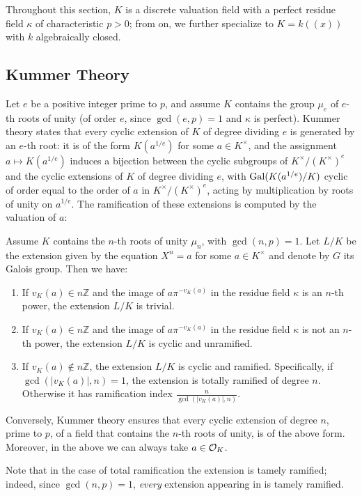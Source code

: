 Throughout this section, $K$ is a discrete valuation field with a perfect
residue field $\kappa$ of characteristic $p > 0$; from
 on, we further specialize to
$K = k((x))$ with $k$ algebraically closed.

\subsection{Kummer Theory}\label{subsection:kummer_theory}

Let $e$ be a positive integer prime to $p$, and assume $K$ contains the group
$\mu_e$ of $e$-th roots of unity (of order $e$, since $\gcd(e,p)=1$ and
$\kappa$ is perfect). Kummer theory states that every cyclic extension of
$K$ of degree dividing $e$ is generated by an $e$-th root: it is of the form
$K(a^{1/e})$ for some $a \in K^\times$, and the assignment
$a \mapsto K(a^{1/e})$ induces a bijection between the cyclic subgroups of
$K^\times/(K^\times)^e$ and the cyclic extensions of $K$ of degree dividing
$e$, with $\operatorname{Gal}(K(a^{1/e})/K)$ cyclic of order equal to the order of $a$ in
$K^\times/(K^\times)^e$, acting by multiplication by roots of unity on
$a^{1/e}$. The ramification of these extensions is computed by the valuation
of $a$:

\begin{theorem}\label{theorem:kummer_ramification}
Assume $K$ contains the $n$-th roots of unity $\mu_n$, with $\gcd(n, p) = 1$.
Let $L/K$ be the extension given by the equation $X^n = a$ for some
$a \in K^\times$ and denote by $G$ its Galois group. Then we have:

\begin{enumerate}
    \item If $v_K(a) \in n\mathbb{Z}$ and the image of $a\pi^{-v_K(a)}$ in the residue field $\kappa$ is an $n$-th power, the extension $L/K$ is trivial.
    \item If $v_K(a) \in n\mathbb{Z}$ and the image of $a\pi^{-v_K(a)}$ in the residue field $\kappa$ is not an $n$-th power, the extension $L/K$ is cyclic and unramified.
    \item If $v_K(a) \notin n\mathbb{Z}$, the extension $L/K$ is cyclic and ramified. Specifically, if $\gcd(|v_K(a)|, n) = 1$, the extension is totally ramified of degree $n$.
     Otherwise it has ramification index $\frac{n}{\gcd(|v_K(a)|, n)}$.
\end{enumerate}
Conversely, Kummer theory ensures that every cyclic extension of degree $n$, prime to $p$, of a field that contains the $n$-th roots of unity, is of the above form.
Moreover, in the above we can always take $a \in \mathcal{O}_K$.
\end{theorem}
Note that in the case of total ramification the extension is tamely ramified;
indeed, since $\gcd(n,p)=1$, \emph{every} extension appearing in
 is tamely ramified.

